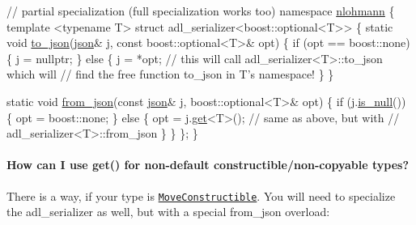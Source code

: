 \begin{DoxyCode}
\textcolor{comment}{// partial specialization (full specialization works too)}
\textcolor{keyword}{namespace }\hyperlink{namespacenlohmann}{nlohmann} \{
    \textcolor{keyword}{template} <\textcolor{keyword}{typename} T>
    \textcolor{keyword}{struct }adl\_serializer<boost::optional<T>> \{
        \textcolor{keyword}{static} \textcolor{keywordtype}{void} \hyperlink{structnlohmann_1_1adl__serializer_adf8cd96afe6ab243b67392dfe35ace89}{to\_json}(\hyperlink{classnlohmann_1_1basic__json}{json}& j, \textcolor{keyword}{const} boost::optional<T>& opt) \{
            \textcolor{keywordflow}{if} (opt == boost::none) \{
                j = \textcolor{keyword}{nullptr};
            \} \textcolor{keywordflow}{else} \{
              j = *opt; \textcolor{comment}{// this will call adl\_serializer<T>::to\_json which will}
                        \textcolor{comment}{// find the free function to\_json in T's namespace!}
            \}
        \}

        \textcolor{keyword}{static} \textcolor{keywordtype}{void} \hyperlink{structnlohmann_1_1adl__serializer_ab39cad07c1a2bf4414d6cae5215b4e7a}{from\_json}(\textcolor{keyword}{const} \hyperlink{classnlohmann_1_1basic__json}{json}& j, boost::optional<T>& opt) \{
            \textcolor{keywordflow}{if} (j.\hyperlink{classnlohmann_1_1basic__json_a8faa039ca82427ed29c486ffd00600c3}{is\_null}()) \{
                opt = boost::none;
            \} \textcolor{keywordflow}{else} \{
                opt = j.\hyperlink{classnlohmann_1_1basic__json_a6b187a22994c12c8cae0dd5ee99dc85e}{get}<T>(); \textcolor{comment}{// same as above, but with }
                                  \textcolor{comment}{// adl\_serializer<T>::from\_json}
            \}
        \}
    \};
\}
\end{DoxyCode}


\paragraph*{How can I use {\ttfamily get()} for non-\/default constructible/non-\/copyable types?}

There is a way, if your type is \href{http://en.cppreference.com/w/cpp/concept/MoveConstructible}{\tt Move\+Constructible}. You will need to specialize the {\ttfamily adl\+\_\+serializer} as well, but with a special {\ttfamily from\+\_\+json} overload\+:


